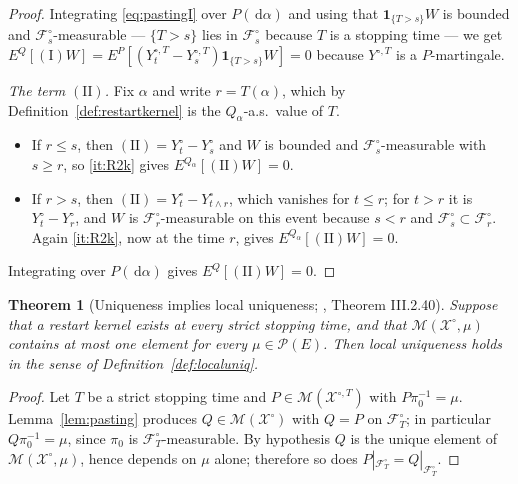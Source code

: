 \documentclass[11pt,a4paper]{article}
\theoremstyle{plain}
\newtheorem{theorem}{Theorem}[section]
\theoremstyle{definition}
\theoremstyle{remark}
\newcommand{\Prob}{\mathcal{P}}                %
\newcommand{\Filt}{\mathcal{F}}
\newcommand{\XX}{\mathcal{X}}                  %
\newcommand{\Msol}{\mathcal{M}}
\newcommand{\one}{\mathbf{1}}
\newcommand{\dif}{\,\mathrm{d}}
\newcommand{\JS}{\cite{JS03}}
\begin{document}
\begin{proof}
  Integrating \eqref{eq:pastingI} over $P(\dif\alpha)$ and using that
  $\one_{\{T > s\}}W$ is bounded and $\Filt^\circ_s$-measurable --- $\{T > s\}$
  lies in $\Filt^\circ_s$ because $T$ is a stopping time --- we get
  $E^Q[(\mathrm{I})W] = E^P[(Y^{\circ,T}_t - Y^{\circ,T}_s)\one_{\{T>s\}}W] = 0$
  because $Y^{\circ,T}$ is a $P$-martingale.

  \emph{The term $(\mathrm{II})$.}  Fix $\alpha$ and write $r = T(\alpha)$, which
  by Definition~\ref{def:restartkernel} is the $Q_\alpha$-a.s.\ value of $T$.
  \begin{itemize}
  \item If $r \leq s$, then $(\mathrm{II}) = Y^\circ_t - Y^\circ_s$ and $W$ is
    bounded and $\Filt^\circ_s$-measurable with $s \geq r$, so \ref{it:R2k} gives
    $E^{Q_\alpha}[(\mathrm{II})W] = 0$.
  \item If $r > s$, then $(\mathrm{II}) = Y^\circ_{t} - Y^\circ_{t \wedge r}$,
    which vanishes for $t \leq r$; for $t > r$ it is $Y^\circ_t - Y^\circ_r$, and
    $W$ is $\Filt^\circ_r$-measurable on this event because $s < r$ and
    $\Filt^\circ_s \subset \Filt^\circ_r$.  Again \ref{it:R2k}, now at the time
    $r$, gives $E^{Q_\alpha}[(\mathrm{II})W] = 0$.
  \end{itemize}
  Integrating over $P(\dif\alpha)$ gives $E^Q[(\mathrm{II})W] = 0$.
\end{proof}

\begin{theorem}[Uniqueness implies local uniqueness; \JS, Theorem III.2.40]
  \label{thm:localuniqueness}
  Suppose that a restart kernel exists at every strict stopping time, and that
  $\Msol(\XX^\circ,\mu)$ contains at most one element for every
  $\mu \in \Prob(E)$.  Then local uniqueness holds in the sense of
  Definition~\ref{def:localuniq}.
\end{theorem}

\begin{proof}
  Let $T$ be a strict stopping time and $P \in \Msol(\XX^{\circ,T})$ with
  $P\pi_0^{-1} = \mu$.  Lemma~\ref{lem:pasting} produces
  $Q \in \Msol(\XX^\circ)$ with $Q = P$ on $\Filt^\circ_T$; in particular
  $Q\pi_0^{-1} = \mu$, since $\pi_0$ is $\Filt^\circ_T$-measurable.  By hypothesis
  $Q$ is the unique element of $\Msol(\XX^\circ,\mu)$, hence depends on $\mu$
  alone; therefore so does $P|_{\Filt^\circ_T} = Q|_{\Filt^\circ_T}$.
\end{proof}
\end{document}
